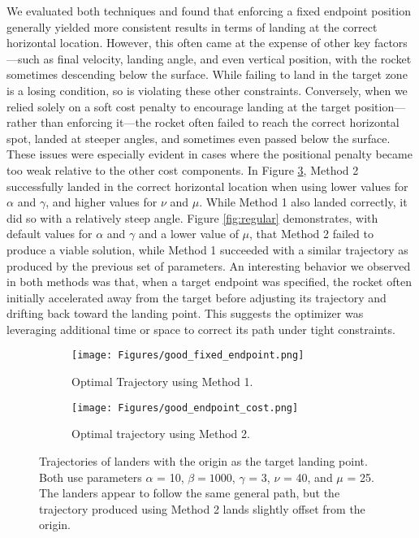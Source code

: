 \documentclass{article}
\begin{document}
We evaluated both techniques and found that enforcing a fixed endpoint position generally yielded more consistent results in terms of landing at the correct horizontal location.
However, this often came at the expense of other key factors—such as final velocity, landing angle, and even vertical position, with the rocket sometimes descending below the surface.
While failing to land in the target zone is a losing condition, so is violating these other constraints.
Conversely, when we relied solely on a soft cost penalty to encourage landing at the target position—rather than enforcing it—the rocket often failed to reach the correct horizontal spot, landed at steeper angles, and sometimes even passed below the surface.
These issues were especially evident in cases where the positional penalty became too weak relative to the other cost components.
In Figure \ref{fig:low_a}, Method 2 successfully landed in the correct horizontal location when using lower values for $\alpha$ and $\gamma$, and higher values for $\nu$ and $\mu$.
While Method 1 also landed correctly, it did so with a relatively steep angle.
Figure \ref{fig:regular} demonstrates, with default values for $\alpha$ and $\gamma$ and a lower value of $\mu$, that Method 2 failed to produce a viable solution, while Method 1 succeeded with a similar trajectory as produced by the previous set of parameters.
An interesting behavior we observed in both methods was that, when a target endpoint was specified, the rocket often initially accelerated away from the target before adjusting its trajectory and drifting back toward the landing point.
This suggests the optimizer was leveraging additional time or space to correct its path under tight constraints.
\begin{figure}[h]
    \centering
    \begin{subfigure}{0.45\textwidth}
        \centering
        \texttt{[image: Figures/good\_fixed\_endpoint.png]}
        \caption{Optimal Trajectory using Method 1.}
        \label{fig:Cost Successful}
    \end{subfigure}
    \hfill
    \begin{subfigure}{0.45\textwidth}
        \centering
        \texttt{[image: Figures/good\_endpoint\_cost.png]}
        \caption{Optimal trajectory using Method 2.}
        \label{fig:Condition 1}
    \end{subfigure}
    \caption{Trajectories of landers with the origin as the target landing point. Both use parameters $\alpha$ = 10, $\beta = 1000$, $\gamma$ = 3, $\nu$ = 40, and $\mu$ = 25. The landers appear to follow the same general path, but the trajectory produced using Method 2 lands slightly offset from the origin.}
    \label{fig:low_a}
\end{figure}
\end{document}
